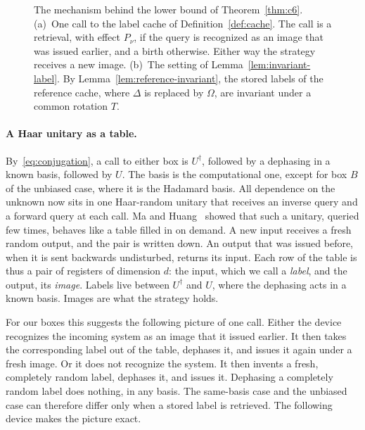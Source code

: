\documentclass[11pt,letterpaper]{article}
\theoremstyle{definition}\newtheorem{definition}[theorem]{Definition}
\begin{document}
\begin{figure}[!b]
\caption{The mechanism behind the lower bound of Theorem~\ref{thm:c6}.
(a)~One call to the label cache of Definition~\ref{def:cache}. The
call is a retrieval, with effect $P_\nu$, if the query is recognized as
an image that was issued earlier, and a birth otherwise. Either way the
strategy receives a new image. (b)~The setting of
Lemma~\ref{lem:invariant-label}. By Lemma~\ref{lem:reference-invariant},
the stored labels of the reference cache, where $\Delta$ is replaced by
$\Omega$, are invariant under a common rotation $T$.}
\label{fig:cache}
\end{figure}

\paragraph{A Haar unitary as a table.}
By~\eqref{eq:conjugation}, a call to either box is $U^\dagger$,
followed by a dephasing in a known basis, followed by $U$. The basis is
the computational one, except for box $B$ of the unbiased case, where
it is the Hadamard basis. All dependence on the unknown now sits in one
Haar-random unitary that receives an inverse query and a forward query
at each call. Ma and Huang~\cite{mahuang2025} showed that such a
unitary, queried few times, behaves like a table filled in on demand. A
new input receives a fresh random output, and the pair is written down.
An output that was issued before, when it is sent backwards
undisturbed, returns its input. Each row of the table is thus a pair of
registers of dimension $d$: the input, which we call a \emph{label},
and the output, its \emph{image}. Labels live between
$U^\dagger$ and $U$, where the dephasing acts in a known basis. Images
are what the strategy holds.

For our boxes this suggests the following picture of one call. Either
the device recognizes the incoming system as an image that it issued
earlier. It then takes the corresponding label out of the table,
dephases it, and issues it again under a fresh image. Or it does not
recognize the system. It then invents a fresh, completely random label,
dephases it, and issues it. Dephasing a completely random label does
nothing, in any basis. The same-basis case and the unbiased case can
therefore differ only when a stored label is retrieved. The following device makes the picture
exact.
\end{document}
